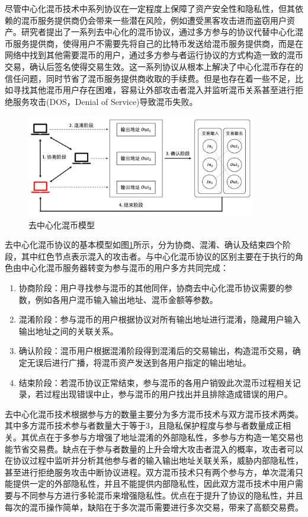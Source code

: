 尽管中心化混币技术中系列协议在一定程度上保障了资产安全性和隐私性，但其依赖的混币服务提供商仍会带来一些潜在风险，例如遭受黑客攻击进而盗窃用户资产。研究者提出了一系列去中心化的混币协议，通过多方参与的协议代替中心化混币服务提供商，使得用户不需要先将自己的比特币发送给混币服务提供商，而是在网络中找到其他需要混币的用户，通过多方参与者运行协议的方式构造一致的混币交易，确认后签名使得交易生效。这一系列协议从根本上解决了中心化混币存在的信任问题，同时节省了混币服务提供商收取的手续费。但是也存在着一些不足，比如寻找其他混币用户存在困难，容易让外部攻击者混入并监听混币关系甚至进行拒绝服务攻击(DOS，Denial of Service)导致混币失败。
 
\begin{figure}
\centering
\includegraphics[width=10cm]{figures/decen-mixer.png}
\caption{去中心化混币模型}
\label{fig:decen-mixer}
\end{figure}

去中心化混币协议的基本模型如图\ref{fig:decen-mixer}所示，分为协商、混淆、确认及结束四个阶段，其中红色节点表示混入的攻击者。与中心化混币协议的区别主要在于执行的角色由中心化混币服务器转变为参与混币的用户多方共同完成：

\begin{enumerate}
	\item 协商阶段：用户寻找参与混币的其他同伴，协商去中心化混币协议需要的参数，例如各用户混币输入输出地址、混币金额等参数。
	\item 混淆阶段：参与混币的用户根据协议对所有输出地址进行混淆，隐藏用户输入输出地址之间的关联关系。
	\item 确认阶段：混币用户根据混淆阶段得到混淆后的交易输出，构造混币交易，确定无误后进行广播，将混币资产发送到各用户指定的输出地址。
	\item 结束阶段：若混币协议正常结束，参与混币的各用户销毁此次混币过程相关记录，若过程出现错误中止，参与混币的用户找出并且排除造成错误的用户。
\end{enumerate}

去中心化混币技术根据参与方的数量主要分为多方混币技术与双方混币技术两类。其中多方混币技术参与者数量大于等于3，且隐私保护程度与参与者数量成正相关。其优点在于多参与方增强了地址混淆的外部隐私性，多参与方构造一笔交易也能节省交易费。缺点在于参与者数量的上升会增大攻击者混入的概率，攻击者可以在协议过程中监听并分析其他参与者的输入输出地址关联关系，威胁内部隐私性，甚至进行拒绝服务攻击中断协议进程。双方混币技术只有两个参与方，单次混淆只能提供一定的外部隐私性，并且不能提供内部隐私性，因此双方混币技术中用户需要与不同参与方进行多轮混币来增强隐私性。优点在于提升了协议的隐私性，并且每次的混币操作简单，缺陷在于多次混币需要进行多次交易，带来了高额交易费。

